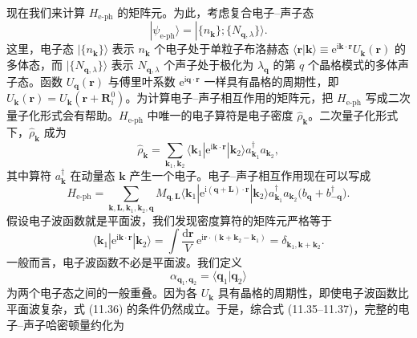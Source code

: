 现在我们来计算 $H_{\text{e-ph}}$ 的矩阵元。为此，考虑复合电子–声子态
\begin{equation*}
|\psi_{\text{e-ph}}\rangle=|\{n_{\mathbf{k}}\};\{N_{\mathbf{q},\lambda}\}\rangle.\tag{11.33}
\end{equation*}
这里，电子态 $|\{n_{\mathbf{k}}\}\rangle$ 表示 $n_{\mathbf{k}}$ 个电子处于单粒子布洛赫态 $\langle\mathbf{r}|\mathbf{k}\rangle\equiv\mathrm{e}^{\mathrm{i}\mathbf{k}\cdot\mathbf{r}}U_{\mathbf{k}}(\mathbf{r})$ 的多体态，而 $|\{N_{\mathbf{q},\lambda}\}\rangle$ 表示 $N_{\mathbf{q},\lambda}$ 个声子处于极化为 $\lambda_{\mathbf{q}}$ 的第 $q$ 个晶格模式的多体声子态。函数 $U_{\mathbf{q}}(\mathbf{r})$ 与傅里叶系数 $\mathrm{e}^{\mathrm{i}\mathbf{q}\cdot\mathbf{r}}$ 一样具有晶格的周期性，即 $U_{\mathbf{k}}(\mathbf{r})=U_{\mathbf{k}}(\mathbf{r}+\mathbf{R}_i^0)$。为计算电子–声子相互作用的矩阵元，把 $H_{\text{e-ph}}$ 写成二次量子化形式会有帮助。$H_{\text{e-ph}}$ 中唯一的电子算符是电子密度 $\hat{\rho}_{\mathbf{k}}$。二次量子化形式下，$\hat{\rho}_{\mathbf{k}}$ 成为
\begin{equation*}
\hat{\rho}_{\mathbf{k}}=\sum_{\mathbf{k}_1,\mathbf{k}_2}\langle\mathbf{k}_1|\mathrm{e}^{\mathrm{i}\mathbf{k}\cdot\mathbf{r}}|\mathbf{k}_2\rangle a_{\mathbf{k}_1}^{\dagger}a_{\mathbf{k}_2},\tag{11.34}
\end{equation*}
其中算符 $a_{\mathbf{k}}^{\dagger}$ 在动量态 $\mathbf{k}$ 产生一个电子。电子–声子相互作用现在可以写成
\begin{equation*}
H_{\text{e-ph}}=\sum_{\mathbf{k},\mathbf{L},\mathbf{k}_1,\mathbf{k}_2,\mathbf{q}}M_{\mathbf{q},\mathbf{L}}\langle\mathbf{k}_1|\mathrm{e}^{\mathrm{i}(\mathbf{q}+\mathbf{L})\cdot\mathbf{r}}|\mathbf{k}_2\rangle a_{\mathbf{k}_1}^{\dagger}a_{\mathbf{k}_2}\bigl(b_{\mathbf{q}}+b_{-\mathbf{q}}^{\dagger}\bigr).\tag{11.35}
\end{equation*}
假设电子波函数就是平面波，我们发现密度算符的矩阵元严格等于
\begin{equation*}
\langle\mathbf{k}_1|\mathrm{e}^{\mathrm{i}\mathbf{k}\cdot\mathbf{r}}|\mathbf{k}_2\rangle=\int\frac{\mathrm{d}\mathbf{r}}{V}\,\mathrm{e}^{\mathrm{i}\mathbf{r}\cdot(\mathbf{k}+\mathbf{k}_2-\mathbf{k}_1)}=\delta_{\mathbf{k}_1,\mathbf{k}+\mathbf{k}_2}.\tag{11.36}
\end{equation*}
一般而言，电子波函数不必是平面波。我们定义
\begin{equation*}
\alpha_{\mathbf{q}_1,\mathbf{q}_2}=\langle\mathbf{q}_1|\mathbf{q}_2\rangle\tag{11.37}
\end{equation*}
为两个电子态之间的一般重叠。因为各 $U_{\mathbf{k}}$ 具有晶格的周期性，即使电子波函数比平面波复杂，式 (11.36) 的条件仍然成立。于是，综合式 (11.35--11.37)，完整的电子–声子哈密顿量约化为
